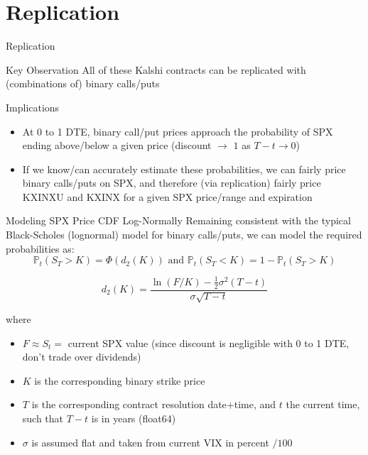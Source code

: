 \documentclass[aspectratio=169]{beamer}
\begin{document}
\section{Replication}

\begin{frame}{Replication}
  \begin{block}{Key Observation}
    All of these Kalshi contracts can be replicated with (combinations of) binary calls/puts
  \end{block}

  \begin{alertblock}{Implications}
    \begin{itemize}
      \item At 0 to 1 DTE, binary call/put prices approach the probability of SPX ending above/below a given price (discount $\to$ $1$ as $T-t \to 0$)
      \item If we know/can accurately estimate these probabilities, we can fairly price binary calls/puts on SPX, and therefore (via replication) fairly price KXINXU and KXINX for a given SPX price/range and expiration
    \end{itemize}
  \end{alertblock}
\end{frame}

\begin{frame}{Modeling SPX Price CDF Log-Normally}
  Remaining consistent with the typical Black-Scholes (lognormal) model for binary calls/puts, we can model the required probabilities as:
  \[
    \mathbb{P}_t(S_T > K) = \Phi(d_2(K)) \text{ and } \mathbb{P}_t(S_T < K) = 1 - \mathbb{P}_t(S_T > K)
  \]
  
  \[
    d_2(K) = \frac{\ln{(F/K)} - \frac{1}{2}\sigma^2(T-t)}{\sigma\sqrt{T-t}}
  \]
  
  where
  \begin{itemize}
    \item $F \approx S_t = $ current SPX value (since discount is negligible with 0 to 1 DTE, don't trade over dividends)
    \item $K$ is the corresponding binary strike price
    \item $T$ is the corresponding contract resolution date+time, and $t$ the current time, such that $T - t$ is in years (float64)
    \item $\sigma$ is assumed flat and taken from current VIX in percent $ / 100$
  \end{itemize}

\end{frame}
\end{document}
